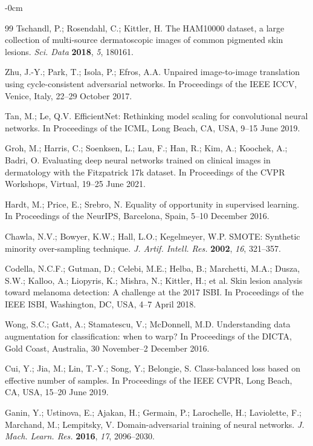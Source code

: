 \documentclass[ai,article,submit,pdftex,moreauthors]{Definitions/mdpi}
\begin{document}
\begin{adjustwidth}{-\extralength}{0cm}
\begin{thebibliography}{99}
Tschandl, P.; Rosendahl, C.; Kittler, H. The HAM10000 dataset, a large collection of multi-source dermatoscopic images of common pigmented skin lesions. \textit{Sci. Data} \textbf{2018}, \textit{5}, 180161.

Zhu, J.-Y.; Park, T.; Isola, P.; Efros, A.A. Unpaired image-to-image translation using cycle-consistent adversarial networks. In Proceedings of the IEEE ICCV, Venice, Italy, 22--29 October 2017.

Tan, M.; Le, Q.V. EfficientNet: Rethinking model scaling for convolutional neural networks. In Proceedings of the ICML, Long Beach, CA, USA, 9--15 June 2019.

Groh, M.; Harris, C.; Soenksen, L.; Lau, F.; Han, R.; Kim, A.; Koochek, A.; Badri, O. Evaluating deep neural networks trained on clinical images in dermatology with the Fitzpatrick 17k dataset. In Proceedings of the CVPR Workshops, Virtual, 19--25 June 2021.

Hardt, M.; Price, E.; Srebro, N. Equality of opportunity in supervised learning. In Proceedings of the NeurIPS, Barcelona, Spain, 5--10 December 2016.

Chawla, N.V.; Bowyer, K.W.; Hall, L.O.; Kegelmeyer, W.P. SMOTE: Synthetic minority over-sampling technique. \textit{J. Artif. Intell. Res.} \textbf{2002}, \textit{16}, 321--357.

Codella, N.C.F.; Gutman, D.; Celebi, M.E.; Helba, B.; Marchetti, M.A.; Dusza, S.W.; Kalloo, A.; Liopyris, K.; Mishra, N.; Kittler, H.; et al. Skin lesion analysis toward melanoma detection: A challenge at the 2017 ISBI. In Proceedings of the IEEE ISBI, Washington, DC, USA, 4--7 April 2018.

Wong, S.C.; Gatt, A.; Stamatescu, V.; McDonnell, M.D. Understanding data augmentation for classification: when to warp? In Proceedings of the DICTA, Gold Coast, Australia, 30 November--2 December 2016.

Cui, Y.; Jia, M.; Lin, T.-Y.; Song, Y.; Belongie, S. Class-balanced loss based on effective number of samples. In Proceedings of the IEEE CVPR, Long Beach, CA, USA, 15--20 June 2019.

Ganin, Y.; Ustinova, E.; Ajakan, H.; Germain, P.; Larochelle, H.; Laviolette, F.; Marchand, M.; Lempitsky, V. Domain-adversarial training of neural networks. \textit{J. Mach. Learn. Res.} \textbf{2016}, \textit{17}, 2096--2030.


\end{thebibliography}
\end{adjustwidth}
\end{document}

